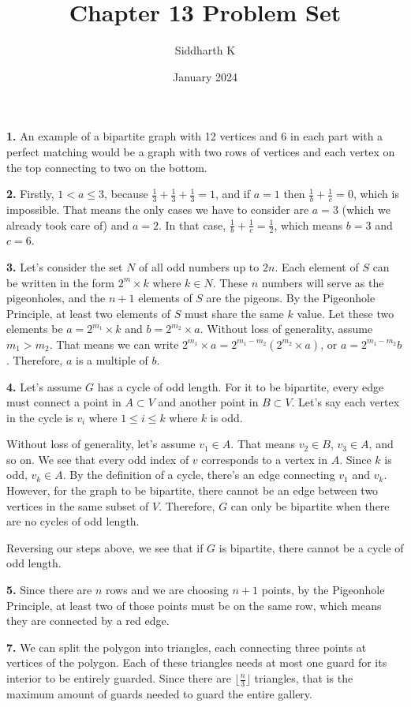 \documentclass{article}
\title{Chapter 13 Problem Set}
\author{Siddharth K}
\date{January 2024}
\begin{document}
\maketitle

\textbf{1.} An example of a bipartite graph with 12 vertices and 6 in each part with a perfect matching would be a graph with two rows of vertices and each vertex on the top connecting to two on the bottom.
\newline

\textbf{2.} Firstly, $1 < a \le 3$, because $\frac{1}{3} + \frac{1}{3} +\frac{1}{3} = 1$, and if $a = 1$ then $\frac{1}{b} + \frac{1}{c} = 0$, which is impossible. That means the only cases we have to consider are $a = 3$ (which we already took care of) and $a = 2$. In that case, $\frac{1}{b} + \frac{1}{c} = \frac{1}{2}$, which means $b = 3$ and $c = 6$.
\newline

\textbf{3.} Let's consider the set $N$ of all odd numbers up to $2n$. Each element of $S$ can be written in the form $2^m \times k$ where $k \in N$. These $n$ numbers will serve as the pigeonholes, and the $n + 1$ elements of $S$ are the pigeons. By the Pigeonhole Principle, at least two elements of $S$ must share the same $k$ value. Let these two elements be $a = 2^{m_1} \times k$ and $b = 2^{m_2} \times a$. Without loss of generality, assume $m_1 > m_2$. That means we can write $2^{m_1} \times a = 2^{m_1 - m_2}(2^{m_2} \times a)$, or $a = 2^{m_1 - m_2}b$. Therefore, $a$ is a multiple of $b$.
\newline

\textbf{4.} Let's assume $G$ has a cycle of odd length. For it to be bipartite, every edge must connect a point in $A \subset V$ and another point in $B \subset V$. Let's say each vertex in the cycle is $v_i$ where $1 \le i \le k$ where $k$ is odd.
\newline

Without loss of generality, let's assume $v_1 \in A$. That means $v_2 \in B$, $v_3 \in A$, and so on. We see that every odd index of $v$ corresponds to a vertex in $A$. Since $k$ is odd, $v_k \in A$. By the definition of a cycle, there's an edge connecting $v_1$ and $v_k$. However, for the graph to be bipartite, there cannot be an edge between two vertices in the same subset of $V$. Therefore, $G$ can only be bipartite when there are no cycles of odd length.
\newline

Reversing our steps above, we see that if $G$ is bipartite, there cannot be a cycle of odd length.
\newline

\textbf{5.} Since there are $n$ rows and we are choosing $n + 1$ points, by the Pigeonhole Principle, at least two of those points must be on the same row, which means they are connected by a red edge.
\newline

\textbf{7.} We can split the polygon into triangles, each connecting three points at vertices of the polygon. Each of these triangles needs at most one guard for its interior to be entirely guarded. Since there are $\lfloor \frac{n}{3} \rfloor$ triangles, that is the maximum amount of guards needed to guard the entire gallery.
\newline
\end{document}
